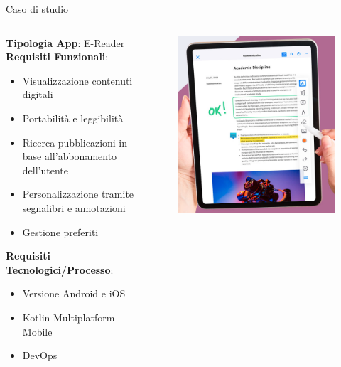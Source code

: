 \begin{frame}{Caso di studio}
    \begin{columns}[onlytextwidth]
        \begin{column}{0.5\textwidth}
            \textbf{Tipologia App}: E-Reader\\
            \vspace{5mm}
            \textbf{Requisiti Funzionali}:
            \begin{itemize}
                \item Visualizzazione contenuti digitali
                \item Portabilità e leggibilità
                \item Ricerca pubblicazioni in base all'abbonamento dell'utente
                \item Personalizzazione tramite segnalibri e annotazioni
                \item Gestione preferiti
            \end{itemize}
            \vspace{5mm}
            \textbf{Requisiti Tecnologici/Processo}:
            \begin{itemize}
                \item Versione Android e iOS
                \item Kotlin Multiplatform Mobile
                \item DevOps
            \end{itemize}
        \end{column}
        \begin{column}{0.45\textwidth}
             \begin{figure}[H]
                \includegraphics[width=1\textwidth]{img/e-reader.png}

\end{figure}
\end{column}
\end{columns}
\end{frame}
